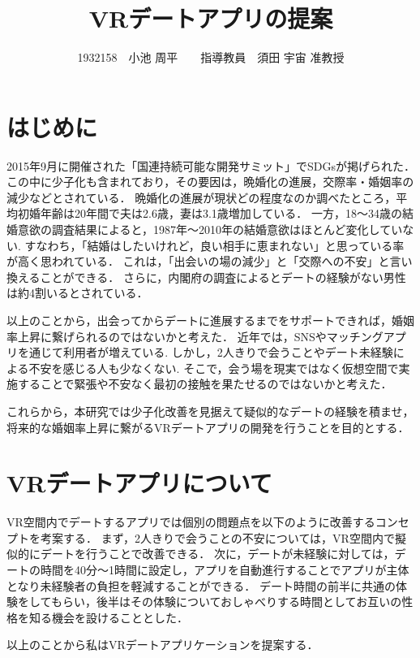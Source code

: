 \documentclass[twocolumn,10pt,a4j]{ltjsarticle}
\title{VRデートアプリの提案}
\author{1932158　小池 周平　　指導教員　須田 宇宙 准教授}
\date{ }
\begin{document}
\maketitle

\section{はじめに}



2015年9月に開催された「国連持続可能な開発サミット」でSDGsが掲げられた．この中に少子化も含まれており，その要因は，晩婚化の進展\cite{sasaki2012}，交際率・婚姻率の減少\cite{naikakufu2019}などとされている．
晩婚化の進展が現状どの程度なのか調べたところ，平均初婚年齢は20年間で夫は2.6歳，妻は3.1歳増加している．
一方，18〜34歳の結婚意欲の調査結果によると，1987年〜2010年の結婚意欲はほとんど変化していない.
すなわち，「結婚はしたいけれど，良い相手に恵まれない」と思っている率が高く思われている\cite{naikakufu2019}．
これは，「出会いの場の減少」と「交際への不安」と言い換えることができる．
さらに，内閣府の調査によるとデートの経験がない男性は約4割いるとされている\cite{naikakufu2022}．


以上のことから，出会ってからデートに進展するまでをサポートできれば，婚姻率上昇に繋げられるのではないかと考えた．
近年では，SNSやマッチングアプリを通じて利用者が増えている\cite{cancan}.
しかし，2人きりで会うことやデート未経験による不安を感じる人も少なくない\cite{prtimes,yoshimura2020}.
そこで，会う場を現実ではなく仮想空間で実施することで緊張や不安なく最初の接触を果たせるのではないかと考えた．


これらから，本研究では少子化改善を見据えて疑似的なデートの経験を積ませ，将来的な婚姻率上昇に繋がるVRデートアプリの開発を行うことを目的とする．



\section{VRデートアプリについて}
VR空間内でデートするアプリでは個別の問題点を以下のように改善するコンセプトを考案する．
まず，2人きりで会うことの不安については，VR空間内で擬似的にデートを行うことで改善できる．
次に，デートが未経験に対しては，デートの時間を40分〜1時間に設定し，アプリを自動進行することでアプリが主体となり未経験者の負担を軽減することができる．
デート時間の前半に共通の体験をしてもらい，後半はその体験についておしゃべりする時間としてお互いの性格を知る機会を設けることとした．


以上のことから私はVRデートアプリケーションを提案する．
\end{document}
